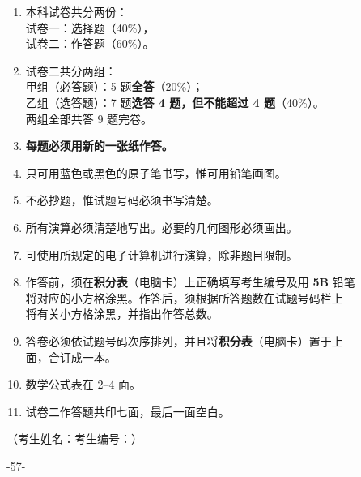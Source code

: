 \documentclass[12pt,a4paper]{ctexart}
\newcommand{\ulinefill}[1]{\underline{\hspace{#1}}}
\begin{document}
\begin{enumerate}[label=（\arabic*）,leftmargin=2.8em,itemsep=0.38em]
  \item 本科试卷共分两份：\\
  \hspace*{1.3em}试卷一：选择题（40\%），\\
  \hspace*{1.3em}试卷二：作答题（60\%）。

  \item 试卷二共分两组：\\
  \hspace*{1.3em}甲组（必答题）：5 题\textbf{全答}（20\%）；\\
  \hspace*{1.3em}乙组（选答题）：7 题\textbf{选答 4 题，但不能超过 4 题}（40\%）。\\
  \hspace*{1.3em}两组全部共答 9 题完卷。

  \item \textbf{每题必须用新的一张纸作答。}

  \item 只可用蓝色或黑色的原子笔书写，惟可用铅笔画图。

  \item 不必抄题，惟试题号码必须书写清楚。

  \item 所有演算必须清楚地写出。必要的几何图形必须画出。

  \item 可使用所规定的电子计算机进行演算，除非题目限制。

  \item 作答前，须在\textbf{积分表}（电脑卡）上正确填写考生编号及用 \textbf{5B} 铅笔\\
  将对应的小方格涂黑。作答后，须根据所答题数在试题号码栏上\\
  将有关小方格涂黑，并指出作答总数。

  \item 答卷必须依试题号码次序排列，并且将\textbf{积分表}（电脑卡）置于上\\
  面，合订成一本。

  \item 数学公式表在 2--4 面。

  \item 试卷二作答题共印七面，最后一面空白。
\end{enumerate}

\vspace{1.0em}

\begin{center}
  \fbox{\rule{0pt}{1.15em}\hspace{1.2em}{\bfseries 未经正式宣布\quad 不得翻看内页}\hspace{1.2em}}
\end{center}

\vspace{1.2em}

\noindent
（考生姓名：\ulinefill{4.4cm}\hfill 考生编号：\ulinefill{4.3cm}）

\vfill

\begin{center}
-57-
\end{center}
\end{document}
